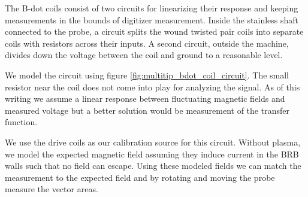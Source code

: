 The B-dot coils consist of two circuits for linearizing their response and keeping measurements in the bounds of digitizer measurement. Inside the stainless shaft connected to the probe, a circuit splits the wound twisted pair coils into separate coils with resistors across their inputs. A second circuit, outside the machine, divides down the voltage between the coil and ground to a reasonable level.



We model the circuit using figure \ref{fig:multitip_bdot_coil_circuit}. The small resistor near the coil does not come into play for analyzing the signal. As of this writing we assume a linear response between fluctuating magnetic fields and measured voltage but a better solution would be measurement of the transfer function.


We use the drive coils as our calibration source for this circuit. Without plasma, we model the expected magnetic field assuming they induce current in the BRB walls such that no field can escape. Using these modeled fields we can match the measurement to the expected field and by rotating and moving the probe measure the vector areas.


